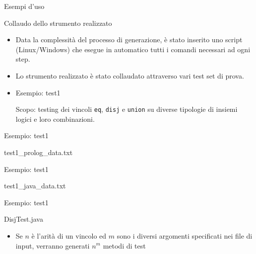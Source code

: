 \documentclass{beamer}
\begin{document}
\begin{frame}{Esempi d'uso}
  		
        {
        	\begin{block}{Collaudo dello strumento realizzato}
        	\begin{itemize}
        	\setlength\itemsep{2em}
        	\item Data la complessit\`a del processo di generazione, \`e stato inserito uno script (Linux/Windows) che esegue in automatico tutti i comandi necessari ad ogni step.
        	
        	\item Lo strumento realizzato \`e stato collaudato attraverso vari test set di prova.
        	
       	 	\item Esempio: test1
       	 		\begin{itemize}
       	 			Scopo: testing dei vincoli \texttt{eq}, \texttt{disj} e \texttt{union} su diverse tipologie di insiemi logici e loro combinazioni.
       	 		\end{itemize}
			\end{itemize}        
        	\end{block}	
        }

        
\end{frame}

\begin{frame}{Esempio: test1}
\begin{exampleblock}{test1\_prolog\_data.txt}
    
\end{exampleblock}
\end{frame}

\begin{frame}{Esempio: test1}
\begin{exampleblock}{test1\_java\_data.txt}
    
\end{exampleblock}
\end{frame}

\begin{frame}{Esempio: test1}
\begin{exampleblock}{DisjTest.java}
    
\end{exampleblock}

\begin{itemize}
\item Se $n$ \`e l'arit\`a di un vincolo ed $m$ sono i diversi argomenti specificati nei file di input, verranno generati $n^m$ metodi di test
\end{itemize} 
 
\end{frame}
\end{document}
